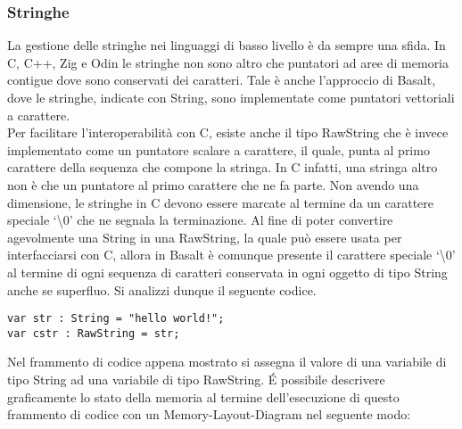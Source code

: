 \subsubsection{Stringhe}
La gestione delle stringhe nei linguaggi di basso livello è da sempre una sfida. In C, C++, Zig e Odin le stringhe non sono altro 
che puntatori ad aree di memoria contigue dove sono conservati dei caratteri. Tale è anche l’approccio di Basalt, dove le stringhe, 
indicate con String, sono implementate come puntatori vettoriali a carattere. \\

Per facilitare l’interoperabilità con C, esiste anche il tipo RawString che è invece implementato come un puntatore scalare a carattere, 
il quale, punta al primo carattere della sequenza che compone la stringa. In C infatti, una stringa altro non è che un puntatore al primo 
carattere che ne fa parte. Non avendo una dimensione, le stringhe in C devono essere marcate al termine da un carattere speciale ‘\textbackslash0’ 
che ne segnala la terminazione. Al fine di poter convertire agevolmente una String in una RawString, la quale può essere usata per 
interfacciarsi con C, allora in Basalt è comunque presente il carattere speciale ‘\textbackslash0’ al termine di ogni sequenza di caratteri 
conservata in ogni oggetto di tipo String anche se superfluo. Si analizzi dunque il seguente codice. \\

\vspace{0.5cm}
\begin{lstlisting}[frame=single]
var str : String = "hello world!";
var cstr : RawString = str;
\end{lstlisting}
\vspace{0.5cm}

Nel frammento di codice appena mostrato si assegna il valore di una variabile di tipo String ad una variabile di tipo RawString. É 
possibile descrivere graficamente lo stato della memoria al termine dell’esecuzione di questo frammento di codice con un 
Memory-Layout-Diagram nel seguente modo: \\


